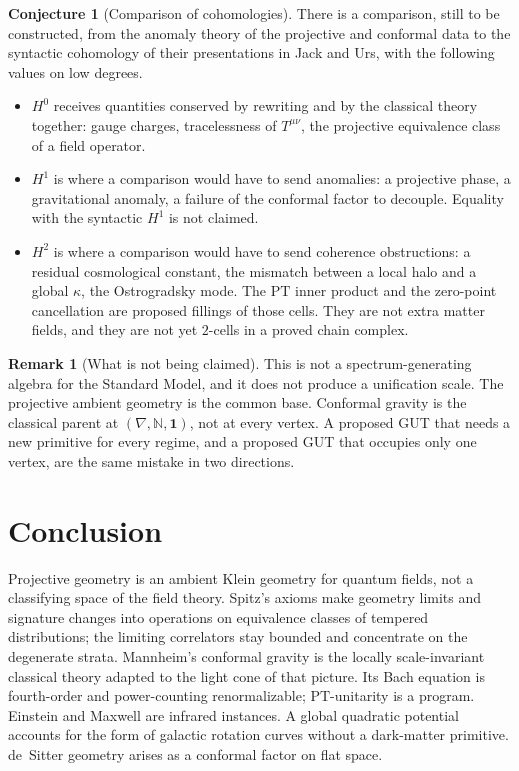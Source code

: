 \documentclass{article}
\theoremstyle{definition}
\newtheorem{remark}{Remark}
\newtheorem{conjecture}{Conjecture}
\begin{document}
\begin{conjecture}[Comparison of cohomologies]
There is a comparison, still to be constructed, from the anomaly theory of
the projective and conformal data to the syntactic cohomology of their
presentations in Jack and Urs, with the following values on low degrees.
\begin{itemize}
  \item \(H^0\) receives quantities conserved by rewriting and by the
        classical theory together: gauge charges, tracelessness of
        \(T^{\mu\nu}\), the projective equivalence class of a field operator.
  \item \(H^1\) is where a comparison would have to send anomalies: a
        projective phase, a gravitational anomaly, a failure of the conformal
        factor to decouple.  Equality with the syntactic \(H^1\) is not
        claimed.
  \item \(H^2\) is where a comparison would have to send coherence
        obstructions: a residual cosmological constant, the mismatch between
        a local halo and a global \(\kappa\), the Ostrogradsky mode.  The
        \(\mathrm{PT}\) inner product and the zero-point cancellation are
        proposed fillings of those cells.  They are not extra matter fields,
        and they are not yet \(2\)-cells in a proved chain complex.
\end{itemize}
\end{conjecture}

\begin{remark}[What is not being claimed]
This is not a spectrum-generating algebra for the Standard Model, and it
does not produce a unification scale.  The projective ambient geometry is the
common base.  Conformal gravity is the classical parent at
\((\nabla,\mathbb{N},\mathbf{1})\), not at every vertex.  A proposed GUT that
needs a new primitive for every regime, and a proposed GUT that occupies only
one vertex, are the same mistake in two directions.
\end{remark}

\section{Conclusion}

Projective geometry is an ambient Klein geometry for quantum fields, not a
classifying space of the field theory.  Spitz's axioms make geometry limits
and signature changes into operations on equivalence classes of tempered
distributions; the limiting correlators stay bounded and concentrate on the
degenerate strata.  Mannheim's conformal gravity is the locally
scale-invariant classical theory adapted to the light cone of that picture.
Its Bach equation is fourth-order and power-counting renormalizable;
\(\mathrm{PT}\)-unitarity is a program.  Einstein and Maxwell are infrared
instances.  A global quadratic potential accounts for the form of galactic
rotation curves without a dark-matter primitive.  de~Sitter geometry arises
as a conformal factor on flat space.
\end{document}

